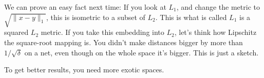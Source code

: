 We can prove an easy fact next time: If you look at $L_1$, and change the metric to $\sqrt{\|x - y\|_1}$, this is isometric to a subset of $L_2$. This is what is called $L_1$ is a squared $L_2$ metric. If you take this embedding into $L_2$, let's think how Lipschitz the square-root mapping is. You didn't make distances bigger by more than $1/\sqrt{\delta}$ on a net, even though on the whole space it's bigger. This is just a sketch. 

To get better results, you need more exotic spaces. 





